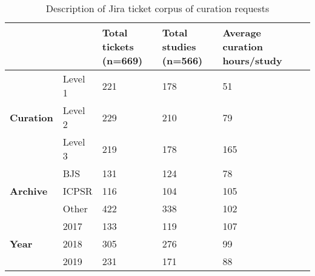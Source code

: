 \documentclass[conference]{IEEEtran}
\begin{document}
\begin{table}[t]
\centering
\caption{Description of Jira ticket corpus of curation requests}
\begin{tabularx}{\columnwidth}{|X|X|X|X|X|X|}
\hline
                                   &         & \textbf{Total \newline tickets \newline (n=669)} & \textbf{Total \newline studies \newline (n=566)} & \textbf{Average curation hours/study}  \\
                                   \hline
\multirow{3}{*}{\textbf{Curation}} & Level 1 & 221                           & 178                           & 51                                  \\
                                   & Level 2 & 229                           & 210                           & 79                                  \\
                                   & Level 3 & 219                           & 178                           & 165                                 \\
                                   \hline
\multirow{3}{*}{\textbf{Archive}}  & BJS     & 131                           & 124                           & 78                                  \\
                                   & ICPSR   & 116                           & 104                           & 105                                 \\
                                   & Other   & 422                           & 338                           & 102                                 \\
                                   \hline
\multirow{3}{*}{\textbf{Year}}     & 2017    & 133                           & 119                           & 107                                 \\
                                   & 2018    & 305                           & 276                           & 99                                  \\
                                   & 2019    & 231                           & 171                           & 88     \\
                                   \hline
\end{tabularx}
\label{table:tickets}
\end{table}
\end{document}
